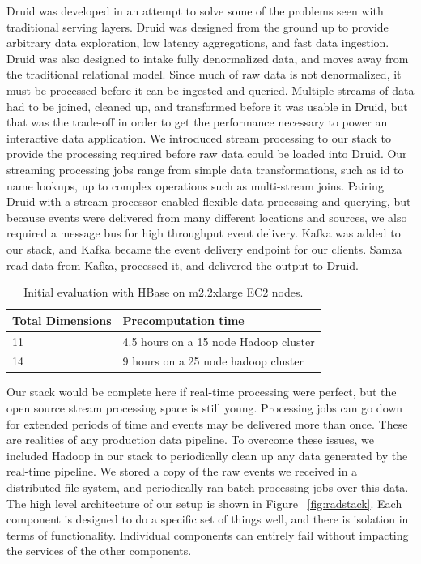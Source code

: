 \documentclass{vldb}
\begin{document}
{Druid was developed in an attempt to solve some of the problems seen with
traditional serving layers. Druid was designed from the ground up to provide
arbitrary data exploration, low latency aggregations, and fast data ingestion.
Druid was also designed to intake fully denormalized data, and moves away from
the traditional relational model. Since much of raw data is not denormalized,
it must be processed before it can be ingested and queried. Multiple streams of
data had to be joined, cleaned up, and transformed before it was usable in
Druid, but that was the trade-off in order to get the performance necessary to
power an interactive data application. We introduced stream processing to our
stack to provide the processing required before raw data could be loaded into
Druid. Our streaming processing jobs range from simple data transformations,
such as id to name lookups, up to complex operations such as multi-stream
joins. Pairing Druid with a stream processor enabled flexible data processing
and querying, but because events were delivered from many different locations
and sources, we also required a message bus for high throughput event delivery.
Kafka was added to our stack, and Kafka became the event delivery endpoint for
our clients.  Samza read data from Kafka, processed it, and delivered the
output to Druid. 

\begin{table}
\centering
\scriptsize\begin{tabular}{| l | l |} \hline
\textbf{Total Dimensions} & \textbf{Precomputation time} \\ \hline
  11 & 4.5 hours on a 15 node Hadoop cluster \\ \hline
  14 & 9 hours on a 25 node hadoop cluster \\ \hline
\end{tabular}
\normalsize
\caption{Initial evaluation with HBase on m2.2xlarge EC2 nodes.}
\label{tab:hbase_results}
\end{table}

Our stack would be complete here if real-time processing were perfect, but the
open source stream processing space is still young. Processing jobs can go down
for extended periods of time and events may be delivered more than once.  These
are realities of any production data pipeline. To overcome these issues, we
included Hadoop in our stack to periodically clean up any data generated by the
real-time pipeline. We stored a copy of the raw events we received in a
distributed file system, and periodically ran batch processing jobs over this
data. The high level architecture of our setup is shown in Figure
~\ref{fig:radstack}. Each component is designed to do a specific set of things
well, and there is isolation in terms of functionality. Individual components
can entirely fail without impacting the services of the other components.

}
\end{document}
